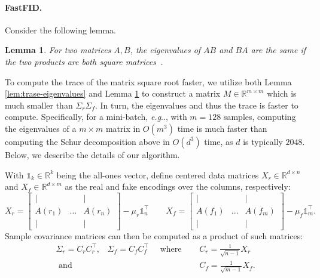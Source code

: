 \documentclass[11pt,a4paper,twoside,openright,final]{memoir}
\makeatletter
\newtheorem{lemma}{Lemma}
\DeclareRobustCommand\onedot{\futurelet\@let@token\@onedot}
\def\@onedot{\ifx\@let@token.\else.\null\fi\xspace}
\def\eg{\emph{e.g}\onedot} \def\Eg{\emph{E.g}\onedot}
\makeatother
\begin{document}
\paragraph{FastFID.}
Consider the following lemma.
\begin{lemma}\label{lem:product-eig}
    For two matrices $A, B$, the eigenvalues of $AB$ and $BA$ are the same if the two products are both square matrices~\cite{low-rank-eigenvalue-problem}.
\end{lemma}
To compute the trace of the matrix square root faster, we utilize both Lemma \ref{lem:trase-eigenvalues} and Lemma \ref{lem:product-eig} to construct a matrix $M\in \mathbb{R}^{m\times m}$ which is much smaller than $\Sigma_r\Sigma_f$. 
In turn, the eigenvalues and thus the trace is faster to compute.
Specifically, for a mini-batch, \eg, with $m=128$ samples, computing the eigenvalues of a $m\times m$ matrix in $O(m^3)$ time is much faster than computing the Schur decomposition above in $O(d^3)$ time, as $d$ is typically $2048$.
Below, we describe the details of our algorithm. 

With $\mathbb{1}_k \in \mathbb{R}^k$ being the all-ones vector, define centered data matrices $X_r\in\mathbb{R}^{d\times n}$ and $X_f\in \mathbb{R}^{d\times m}$ as the real and fake encodings over the columns, respectively:
\begin{equation}
    X_r = \left[
        \begin{matrix}
            | & & |\\
            A(r_1) & ... & A(r_n)\\
            | & & |
        \end{matrix}
    \right] - \mu_r\mathbb{1}_n^\intercal \qquad
    X_f = \left[
        \begin{matrix}
            | & & |\\
            A(f_1) & ... & A(f_m)\\
            | & & |
        \end{matrix} 
    \right] - \mu_f\mathbb{1}_m^\intercal.
\end{equation} 
Sample covariance matrices can then be computed as a product of such matrices:
\begin{align}
    \Sigma_r = C_rC_r^\intercal\text{,}\quad \Sigma_f=C_fC_f^\intercal\quad\text{ where }\quad & C_r = \frac{1}{\sqrt{n-1}}X_r\\
    \text{ and }\quad & C_f = \frac{1}{\sqrt{m-1}}X_f.
\end{align}
\end{document}
